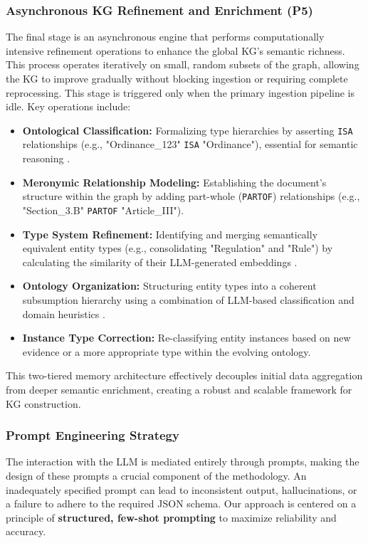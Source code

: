 \subsubsection{Asynchronous KG Refinement and Enrichment (P5)}
The final stage is an asynchronous engine that performs computationally intensive refinement operations to enhance the global KG's semantic richness. This process operates iteratively on small, random subsets of the graph, allowing the KG to improve gradually without blocking ingestion or requiring complete reprocessing. This stage is triggered only when the primary ingestion pipeline is idle. Key operations include:
\begin{itemize}
    \item \textbf{Ontological Classification:} Formalizing type hierarchies by asserting \texttt{ISA} relationships (e.g., "Ordinance\_123" \texttt{ISA} "Ordinance"), essential for semantic reasoning \parencite{RefWorks:RefID:135-noy2001ontology, RefWorks:RefID:78-minsky1974framework}.
    \item \textbf{Meronymic Relationship Modeling:} Establishing the document's structure within the graph by adding part-whole (\texttt{PARTOF}) relationships (e.g., "Section\_3.B" \texttt{PARTOF} "Article\_III").
    \item \textbf{Type System Refinement:} Identifying and merging semantically equivalent entity types (e.g., consolidating "Regulation" and "Rule") by calculating the similarity of their LLM-generated embeddings \parencite{RefWorks:RefID:167-gardazi2025bert}.
    \item \textbf{Ontology Organization:} Structuring entity types into a coherent subsumption hierarchy using a combination of LLM-based classification and domain heuristics \parencite{RefWorks:RefID:6-2022knowledge}.
    \item \textbf{Instance Type Correction:} Re-classifying entity instances based on new evidence or a more appropriate type within the evolving ontology.
\end{itemize}
This two-tiered memory architecture effectively decouples initial data aggregation from deeper semantic enrichment, creating a robust and scalable framework for KG construction.

\subsubsection{Prompt Engineering Strategy}
The interaction with the LLM is mediated entirely through prompts, making the design of these prompts a crucial component of the methodology. An inadequately specified prompt can lead to inconsistent output, hallucinations, or a failure to adhere to the required JSON schema. Our approach is centered on a principle of \textbf{structured, few-shot prompting} to maximize reliability and accuracy.

